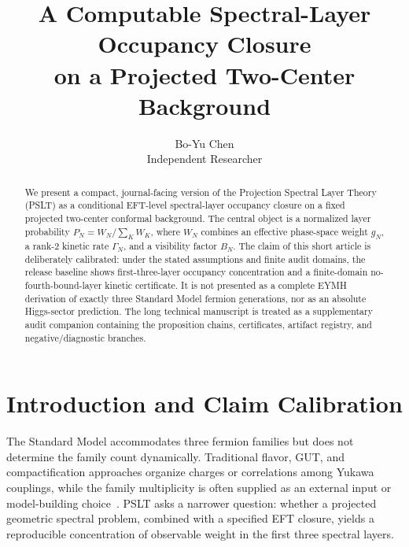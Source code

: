 \documentclass[11pt,a4paper]{article}
\title{\Large\bf \texorpdfstring{A Computable Spectral-Layer Occupancy Closure\\ on a Projected Two-Center Background}{A Computable Spectral-Layer Occupancy Closure on a Projected Two-Center Background}}
\author{Bo-Yu Chen\\Independent Researcher}
\date{}
\begin{document}
\maketitle

\begin{abstract}
We present a compact, journal-facing version of the Projection Spectral Layer Theory (PSLT) as a conditional EFT-level spectral-layer occupancy closure on a fixed projected two-center conformal background.
The central object is a normalized layer probability
\(P_N=W_N/\sum_K W_K\), where \(W_N\) combines an effective phase-space weight \(g_N\), a rank-2 kinetic rate \(\Gamma_N\), and a visibility factor \(B_N\).
The claim of this short article is deliberately calibrated: under the stated assumptions and finite audit domains, the release baseline shows first-three-layer occupancy concentration and a finite-domain no-fourth-bound-layer kinetic certificate.
It is not presented as a complete EYMH derivation of exactly three Standard Model fermion generations, nor as an absolute Higgs-sector prediction.
The long technical manuscript is treated as a supplementary audit companion containing the proposition chains, certificates, artifact registry, and negative/diagnostic branches.
\end{abstract}

\section{Introduction and Claim Calibration}
\label{sec:intro}

The Standard Model accommodates three fermion families but does not determine the family count dynamically.
Traditional flavor, GUT, and compactification approaches organize charges or correlations among Yukawa couplings, while the family multiplicity is often supplied as an external input or model-building choice~\cite{Cabibbo1963,KobayashiMaskawa1973,MakiNakagawaSakata1962,FroggattNielsen1979,AltarelliFeruglio2010,Feruglio2015,CandelasHorowitzStromingerWitten1985,GeorgiGlashow1974,FritzschMinkowski1975,PatiSalam1974,GurseyRamondSikivie1976,Slansky1981}.
PSLT asks a narrower question: whether a projected geometric spectral problem, combined with a specified EFT closure, yields a reproducible concentration of observable weight in the first three spectral layers.
\end{document}
